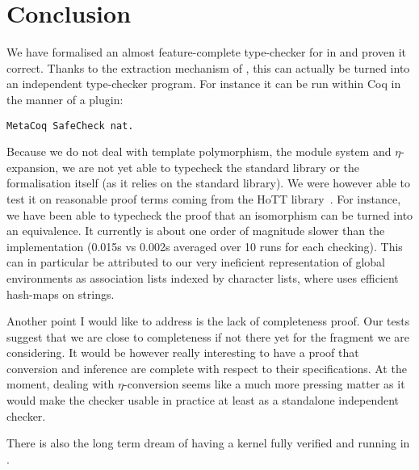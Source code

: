 \chapter{Conclusion}

We have formalised an almost feature-complete type-checker for \Coq in \Coq
and proven it correct. Thanks to the extraction mechanism of \Coq, this can
actually be turned into an independent type-checker program.
For instance it can be run within Coq in the manner of a plugin:
\begin{verbatim}
MetaCoq SafeCheck nat.
\end{verbatim}

Because we do not deal with template polymorphism, the module system and
\(\eta\)-expansion, we are not yet able to typecheck the standard library
or the formalisation itself (as it relies on the standard library).
We were however able to test it on reasonable proof terms coming from
the \acrshort{HoTT} library~.
%
For instance, we have been able to typecheck the proof that an isomorphism can
be turned into an equivalence.
It currently is about one order of magnitude slower than the \Coq
implementation (0.015s vs 0.002s averaged over 10 runs for each checking).
This can in particular be attributed to our very ineficient representation of
global environments as association lists indexed by character lists, where \Coq
uses efficient hash-maps on strings.

Another point I would like to address is the lack of completeness proof.
Our tests suggest that we are close to completeness if not there yet for the
fragment we are considering. It would be however really interesting to have a
proof that conversion and inference are complete with respect to their
specifications.
At the moment, dealing with \(\eta\)-conversion seems like a much more pressing
matter as it would make the checker usable in practice at least as a standalone
independent checker.

There is also the long term dream of having a \Coq kernel fully verified and
running in \Coq.